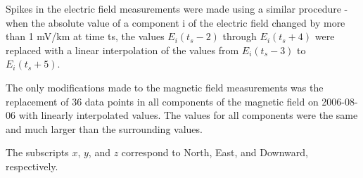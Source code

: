 \documentclass[draft,linenumbers]{agujournal2018}
\begin{document}
Spikes in the electric field measurements were made using a similar procedure - when the absolute value of a component i of the electric field changed by more than 1 mV/km at time ts, the values $E_i(t_s-2)$ through $E_i(t_s+4)$ were replaced with a linear interpolation of the values from $E_i(t_s-3)$ to $E_i(t_s + 5)$.

The only modifications made to the magnetic field measurements was the replacement of 36 data points in all components of the magnetic field on 2006-08-06 with linearly interpolated values. The values for all components were the same and much larger than the surrounding values.

The subscripts $x$, $y$, and $z$ correspond to North, East, and Downward, respectively.






%
%
%
%
%
%
%
%
\end{document}
